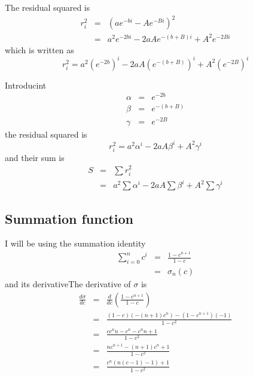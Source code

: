 \documentclass{article}
\begin{document}
The residual squared is%
\begin{eqnarray}
r_{i}^{2} &=&\left( ae^{-bi}-Ae^{-Bi}\right) ^{2} \\
&=&a^{2}e^{-2bi}-2aAe^{-\left( b+B\right) i}+A^{2}e^{-2Bi}
\end{eqnarray}%
which is written as%
\begin{equation}
r_{i}^{2}=a^{2}\left( e^{-2b}\right) ^{i}-2aA\left( e^{-\left( b+B\right)
}\right) ^{i}+A^{2}\left( e^{-2B}\right) ^{i}
\end{equation}

Introducint%
\begin{eqnarray}
\alpha &=&e^{-2b}  \label{def:alpha} \\
\beta &=&e^{-\left( b+B\right) }  \label{def:beta} \\
\gamma &=&e^{-2B}  \label{def:gamma}
\end{eqnarray}%
the residual squared is%
\begin{equation}
r_{i}^{2}=a^{2}\alpha ^{i}-2aA\beta ^{i}+A^{2}\gamma ^{i}
\label{eq:r_i^2(alpha,beta,gamma)}
\end{equation}%
and their sum is%
\begin{eqnarray}
S &=&\sum r_{i}^{2} \\
&=&a^{2}\sum \alpha ^{i}-2aA\sum \beta ^{i}+A^{2}\sum \gamma ^{i}
\label{eq:S}
\end{eqnarray}

\subsection{Summation function}

I will be using the summation identity%
\begin{eqnarray}
\sum_{i=0}^{n}c^{i} &=&\frac{1-c^{n+1}}{1-c} \\
&=&\sigma _{n}\left( c\right)  \label{def:sigma-fun}
\end{eqnarray}%
and its derivativeThe derivative of $\sigma $ is%
\begin{eqnarray}
\frac{d\sigma }{dc} &=&\frac{d}{dc}\left( \frac{1-c^{n+1}}{1-c}\right) \\
&=&\frac{\left( 1-c\right) \left( -\left( n+1\right) c^{n}\right) -\left(
1-c^{n+1}\right) \left( -1\right) }{1-c^{2}} \\
&=&\frac{cc^{n}n-c^{n}-c^{n}n+1}{1-c^{2}} \\
&=&\frac{nc^{n+1}-\left( n+1\right) c^{n}+1}{1-c^{2}} \\
&=&\frac{c^{n}\left( n\left( c-1\right) -1\right) +1}{1-c^{2}}
\label{eq:sigma'}
\end{eqnarray}
\end{document}
